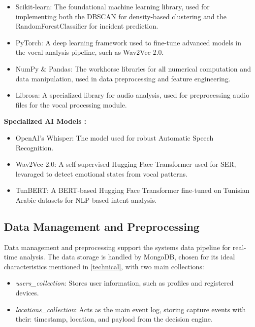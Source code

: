 \documentclass[12pt,a4paper,oneside,english]{book}
\begin{document}
\begin{itemize}

\item Scikit-learn: The foundational machine learning library, used for implementing both the DBSCAN for density-based clustering and the RandomForestClassifier for incident prediction.
\item PyTorch: A deep learning framework used to fine-tune advanced models in the vocal analysis pipeline, such as Wav2Vec 2.0.
\item NumPy \& Pandas: The workhorse libraries for all numerical computation and data manipulation, used in data preprocessing and feature engineering.
\item Librosa: A specialized library for audio analysis, used for preprocessing audio files for the vocal processing module.
\end{itemize}

\textbf{Specialized AI Models :}
\begin{itemize}
\item OpenAI's Whisper: The model used for robust Automatic Speech Recognition.
\item Wav2Vec 2.0: A self-supervised Hugging Face Transformer used for SER, levaraged to detect emotional states from vocal patterns.
\item TunBERT: A BERT-based Hugging Face Transformer fine-tuned on Tunisian Arabic datasets for NLP-based intent analysis.%
\end{itemize}

\subsection{Data Management and Preprocessing}
\label{sec:data_management}
Data management and preprocessing support the systems data pipeline for real-time analysis.
The data storage is handled by MongoDB, chosen for its ideal characteristics mentioned in \ref{technical}, with two main collections:
\begin{itemize}
    \item \textit{users\_collection}: Stores user information, such as profiles and registered devices.
    \item \textit{locations\_collection}: Acts as the main event log, storing capture events with their: timestamp, location, and payload from the decision engine.
\end{itemize}
\end{document}
